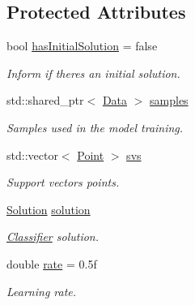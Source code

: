 \subsection*{Protected Attributes}
\begin{DoxyCompactItemize}
\item 
\mbox{\label{class_classifier_a1de0c258e4a175ebf96a18ec7ee33381}} 
bool \hyperlink{class_classifier_a1de0c258e4a175ebf96a18ec7ee33381}{has\+Initial\+Solution} = false
\begin{DoxyCompactList}\small\item\em Inform if there\textquotesingle{}s an initial solution. \end{DoxyCompactList}\item 
\mbox{\label{class_classifier_aad6a4fcea8f44339d7a6302f530852ca}} 
std\+::shared\+\_\+ptr$<$ \hyperlink{class_data}{Data} $>$ \hyperlink{class_classifier_aad6a4fcea8f44339d7a6302f530852ca}{samples}
\begin{DoxyCompactList}\small\item\em Samples used in the model training. \end{DoxyCompactList}\item 
\mbox{\label{class_classifier_ae9146fbbd020de483957a1ea68b614c7}} 
std\+::vector$<$ \hyperlink{class_point}{Point} $>$ \hyperlink{class_classifier_ae9146fbbd020de483957a1ea68b614c7}{svs}
\begin{DoxyCompactList}\small\item\em Support vectors points. \end{DoxyCompactList}\item 
\mbox{\label{class_classifier_a8e70651d36fa396f55028847acd6ae50}} 
\hyperlink{class_solution}{Solution} \hyperlink{class_classifier_a8e70651d36fa396f55028847acd6ae50}{solution}
\begin{DoxyCompactList}\small\item\em \hyperlink{class_classifier}{Classifier} solution. \end{DoxyCompactList}\item 
\mbox{\label{class_classifier_af9867e5919742de1303dd971a9a1c19a}} 
double \hyperlink{class_classifier_af9867e5919742de1303dd971a9a1c19a}{rate} = 0.\+5f
\begin{DoxyCompactList}\small\item\em Learning rate. \end{DoxyCompactList}\item 

\end{DoxyCompactItemize}
